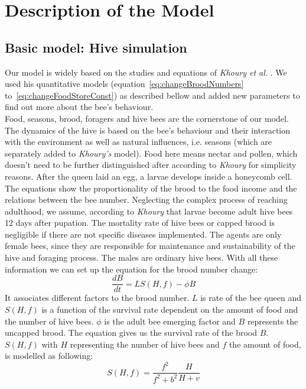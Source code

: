 \section{Description of the Model}
\subsection{Basic model: Hive simulation}
	\label{chap:basicModel}
	Our model is widely based on the studies and equations of \textit{Khoury et al.} \cite{khoury13}. We used his quantitative models (equation~\ref{eq:changeBroodNumbers} to~\ref{eq:changeFoodStoreConst}) as described bellow and added new parameters to find out more about the bee's behaviour.\\
	Food, seasons, brood, foragers and hive bees are the cornerstone of our model. The dynamics of the hive is based on the bee's behaviour and their interaction with the environment as well as natural influences, i.e. seasons (which are separately added to \textit{Khoury's} model). Food here means nectar and pollen, which doesn't need to be further distinguished after according to \textit{Khoury} for simplicity reasons. After the queen laid an egg, a larvae develops inside a honeycomb cell. The equations show the proportionality of the brood to the food income and the relations between the bee number. Neglecting the complex process of reaching adulthood, we assume, according to \textit{Khoury} that larvae become adult hive bees 12 days after pupation. The mortality rate of hive bees or capped brood is negligible if there are not specific diseases implemented. The agents are only female bees, since they are responsible for maintenance and sustainability of the hive and foraging process. The males are ordinary hive bees. With all these information we can set up the equation for the brood number change:	
	\begin{equation}\label{eq:changeBroodNumbers}
		\frac{dB}{dt} = LS(H,f)-\phi B
	\end{equation}	
	It associates different factors to the brood number. $L$ is rate of the bee queen and $S(H,f)$ is a function of the survival rate dependent on the amount of food and the number of hive bees. $\phi$ is the adult bee emerging factor and $B$ represents the uncapped brood. The equation gives us the survival rate of the brood $B$. $S(H,f)$ with $H$ representing the number of hive bees and $f$ the amount of food, is modelled as following:
	\begin{equation}\label{eq:functionHiveBeesFood}
		S(H,f)=\frac{f^2}{f^2+b^2}\frac{H}{H+v}
	\end{equation}	
